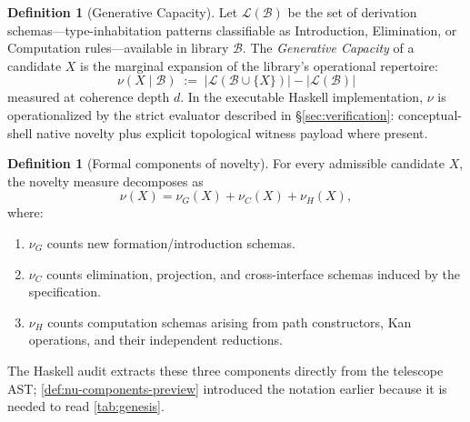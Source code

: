 \documentclass[11pt,a4paper]{article}
\theoremstyle{plain}
\theoremstyle{definition}
\newtheorem{definition}[theorem]{Definition}
\theoremstyle{remark}
\begin{document}
\begin{definition}[Generative Capacity]
\label{def:novelty}
Let $\mathcal{L}(\mathcal{B})$ be the set of derivation schemas---type-inhabitation patterns classifiable as Introduction, Elimination, or Computation rules---available in library $\mathcal{B}$.
The \emph{Generative Capacity} of a candidate $X$ is the marginal expansion of the library's operational repertoire:
\begin{equation}
    \nu(X \mid \mathcal{B}) \;:=\; |\mathcal{L}(\mathcal{B} \cup \{X\})| - |\mathcal{L}(\mathcal{B})|
\end{equation}
measured at coherence depth $d$.
In the executable Haskell implementation, $\nu$ is operationalized by the strict evaluator described in \S\ref{sec:verification}: conceptual-shell native novelty plus explicit topological witness payload where present.
\end{definition}

\begin{definition}[Formal components of novelty]
\label{def:nu-components}
For every admissible candidate $X$, the novelty measure decomposes as
\[
  \nu(X) = \nu_G(X) + \nu_C(X) + \nu_H(X),
\]
where:
\begin{enumerate}[nosep]
    \item $\nu_G$ counts new formation/introduction schemas.
    \item $\nu_C$ counts elimination, projection, and cross-interface schemas induced by the specification.
    \item $\nu_H$ counts computation schemas arising from path constructors, Kan operations, and their independent reductions.
\end{enumerate}
The Haskell audit extracts these three components directly from the telescope AST; \cref{def:nu-components-preview} introduced the notation earlier because it is needed to read \cref{tab:genesis}.
\end{definition}
\end{document}
